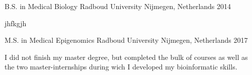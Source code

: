 

\begin{cventries}

  \cventry
    {B.S. in Medical Biology} %
    {Radboud University} %
    {Nijmegen, Netherlands} %
    {2014} %
    {
      \begin{cvitems} %
        \item {jhfkgjh}
      \end{cvitems}
    }

  \cventry
    {M.S. in Medical Epigenomics} %
    {Radboud University} %
    {Nijmegen, Netherlands} %
    {2017} %
    {
      \begin{cvitems} %
        \item {I did not finish my master degree, but completed the bulk of courses as well as the 
        two master-internships during wich I developed my bioinformatic skills.}
      \end{cvitems}
    }


\end{cventries}